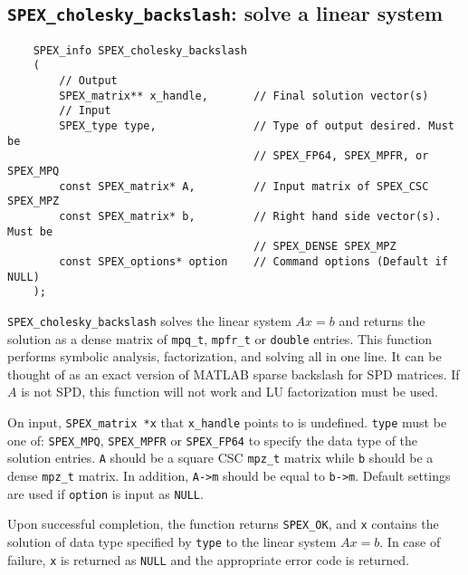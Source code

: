 \documentclass[12pt]{report}
\theoremstyle{definition}
\begin{document}
\subsection{\texttt{SPEX\_cholesky\_backslash}: solve a linear system}
\label{ss:SPEX_Chol_backslash}

\begin{mdframed}[userdefinedwidth=6in]
{\footnotesize
\begin{verbatim}
    SPEX_info SPEX_cholesky_backslash
    (
        // Output
        SPEX_matrix** x_handle,       // Final solution vector(s)
        // Input
        SPEX_type type,               // Type of output desired. Must be
                                      // SPEX_FP64, SPEX_MPFR, or SPEX_MPQ
        const SPEX_matrix* A,         // Input matrix of SPEX_CSC SPEX_MPZ
        const SPEX_matrix* b,         // Right hand side vector(s). Must be
                                      // SPEX_DENSE SPEX_MPZ 
        const SPEX_options* option    // Command options (Default if NULL)
    );
\end{verbatim}
} \end{mdframed}

\verb|SPEX_cholesky_backslash| solves the linear system $Ax=b$ and returns the solution
as a dense matrix of \verb|mpq_t|, \verb|mpfr_t| or \verb|double| entries. This
function performs symbolic analysis, factorization, and solving all in one line. 
It can be thought of as an exact version of MATLAB sparse backslash for SPD matrices.
If $A$ is not SPD, this function will not work and LU factorization must be used.

On input, \verb|SPEX_matrix *x| that \verb|x_handle| points to is undefined. \verb|type| must be one of:
\verb|SPEX_MPQ|, \verb|SPEX_MPFR| or \verb|SPEX_FP64| to specify the data type
of the solution entries. \verb|A| should be a square CSC \verb|mpz_t| matrix
while \verb|b| should be a dense \verb|mpz_t| matrix. In addition, \verb|A->m|
should be equal to \verb|b->m|.  Default settings are used if
\verb|option| is input as \verb|NULL|.

Upon successful completion, the function returns \verb|SPEX_OK|, and
\verb|x| contains the solution of data type specified by
\verb|type| to the linear system $Ax=b$. In case of failure, \verb|x| is returned as \verb|NULL| and the appropriate error code is returned.
\end{document}
